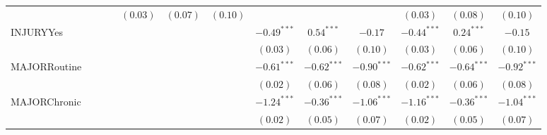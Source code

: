\documentclass[12pt,twoside]{reedthesis}
\begin{document}
\begin{table}
\begin{center}
\begin{tiny}
\begin{tabular}{l@{} c@{} c@{} c@{} c@{} c@{} c@{} c@{} c@{} c@{} c@{} c@{} c@{} }
                                     &                        &                        &                        & $(0.03)$               & $(0.07)$               & $(0.10)$               &                        &                        &                        & $(0.03)$               & $(0.08)$               & $(0.10)$               \\
  INJURYYes                          &                        &                        &                        &                        &                        &                        & $\mathbf{-0.49}^{***}$ & $\mathbf{0.54}^{***}$  & $-0.17$                & $\mathbf{-0.44}^{***}$ & $\mathbf{0.24}^{***}$  & $-0.15$                \\
                                     &                        &                        &                        &                        &                        &                        & $(0.03)$               & $(0.06)$               & $(0.10)$               & $(0.03)$               & $(0.06)$               & $(0.10)$               \\
  MAJORRoutine                       &                        &                        &                        &                        &                        &                        & $\mathbf{-0.61}^{***}$ & $\mathbf{-0.62}^{***}$ & $\mathbf{-0.90}^{***}$ & $\mathbf{-0.62}^{***}$ & $\mathbf{-0.64}^{***}$ & $\mathbf{-0.92}^{***}$ \\
                                     &                        &                        &                        &                        &                        &                        & $(0.02)$               & $(0.06)$               & $(0.08)$               & $(0.02)$               & $(0.06)$               & $(0.08)$               \\
  MAJORChronic                       &                        &                        &                        &                        &                        &                        & $\mathbf{-1.24}^{***}$ & $\mathbf{-0.36}^{***}$ & $\mathbf{-1.06}^{***}$ & $\mathbf{-1.16}^{***}$ & $\mathbf{-0.36}^{***}$ & $\mathbf{-1.04}^{***}$ \\
                                     &                        &                        &                        &                        &                        &                        & $(0.02)$               & $(0.05)$               & $(0.07)$               & $(0.02)$               & $(0.05)$               & $(0.07)$               \\

\end{tabular}
\end{tiny}
\end{center}
\end{table}
\end{document}
